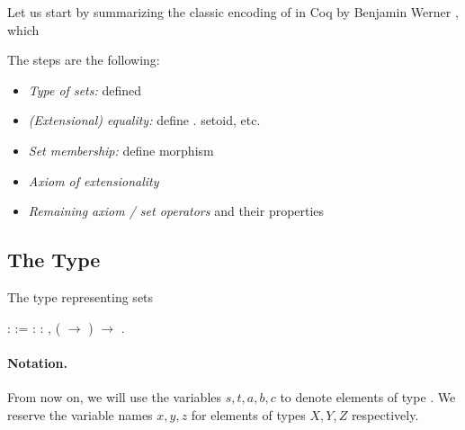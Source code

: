 
Let us start by summarizing the classic encoding of \ZF{} in Coq by Benjamin Werner \cite{DBLP:conf/tacs/Werner97}\footnotemark{}, which 


The steps are the following:
\begin{itemize}
  \item \emph{Type of sets:} defined \footnotemark{}
  \item \emph{(Extensional) equality:} define . setoid, etc.
  \item \emph{Set membership:} define  morphism
  \item \emph{Axiom of extensionality}
  \item \emph{Remaining axiom / set operators} and their properties
\end{itemize}


\subsection{The Type \texorpdfstring{}{SET}}
The type representing sets

\begin{coqdoccode}
\coqdocnoindent
{}  :  :=\coqdoceol
\coqdocindent{2.00em}
 : \coqdockw{\ensuremath{\forall}}  : , ( \ensuremath{\rightarrow} ) \ensuremath{\rightarrow} .\coqdoceol
\coqdocemptyline
\end{coqdoccode}


\noindent\paragraph{Notation.} From now on, we will use the variables $s, t, a, b, c$ to denote elements of type . We reserve the variable names $x,y,z$ for elements of types $X,Y,Z$ respectively.

